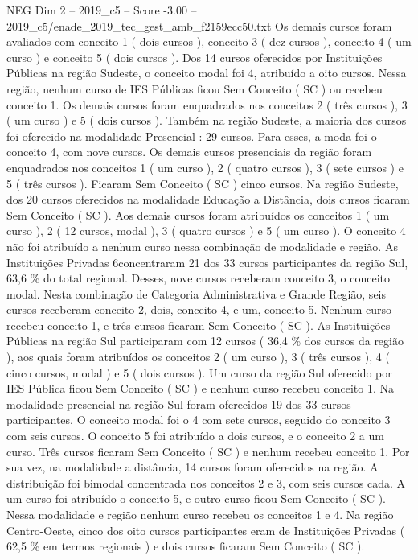 \begin{textsample}{NEG Dim 2 – 2019\_c5 – Score -3.00 – 2019\_c5/enade\_2019\_tec\_gest\_amb\_f2159ecc50.txt}
Os demais cursos foram avaliados com conceito 1 ( dois cursos ), conceito 3 ( dez cursos ), conceito 4 ( um curso ) e conceito 5 ( dois cursos ).
Dos 14 cursos oferecidos por Instituições Públicas na região Sudeste, o conceito modal foi 4, atribuído a oito cursos.
Nessa região, nenhum curso de IES Públicas ficou Sem Conceito ( SC ) ou recebeu conceito 1.
Os demais cursos foram enquadrados nos conceitos 2 ( três cursos ), 3 ( um curso ) e 5 ( dois cursos ).
Também na região Sudeste, a maioria dos cursos foi oferecido na modalidade Presencial : 29 cursos.
Para esses, a moda foi o conceito 4, com nove cursos.
Os demais cursos presenciais da região foram enquadrados nos conceitos 1 ( um curso ), 2 ( quatro cursos ), 3 ( sete cursos ) e 5 ( três cursos ).
Ficaram Sem Conceito ( SC ) cinco cursos.
Na região Sudeste, dos 20 cursos oferecidos na modalidade Educação a Distância, dois cursos ficaram Sem Conceito ( SC ).
Aos demais cursos foram atribuídos os conceitos 1 ( um curso ), 2 ( 12 cursos, modal ), 3 ( quatro cursos ) e 5 ( um curso ).
O conceito 4 não foi atribuído a nenhum curso nessa combinação de modalidade e região.
As Instituições Privadas 6concentraram 21 dos 33 cursos participantes da região Sul, 63,6 \% do total regional.
Desses, nove cursos receberam conceito 3, o conceito modal.
Nesta combinação de Categoria Administrativa e Grande Região, seis cursos receberam conceito 2, dois, conceito 4, e um, conceito 5.
Nenhum curso recebeu conceito 1, e três cursos ficaram Sem Conceito ( SC ).
As Instituições Públicas na região Sul participaram com 12 cursos ( 36,4 \% dos cursos da região ), aos quais foram atribuídos os conceitos 2 ( um curso ), 3 ( três cursos ), 4 ( cinco cursos, modal ) e 5 ( dois cursos ).
Um curso da região Sul oferecido por IES Pública ficou Sem Conceito ( SC ) e nenhum curso recebeu conceito 1.
Na modalidade presencial na região Sul foram oferecidos 19 dos 33 cursos participantes.
O conceito modal foi o 4 com sete cursos, seguido do conceito 3 com seis cursos.
O conceito 5 foi atribuído a dois cursos, e o conceito 2 a um curso.
Três cursos ficaram Sem Conceito ( SC ) e nenhum recebeu conceito 1.
Por sua vez, na modalidade a distância, 14 cursos foram oferecidos na região.
A distribuição foi bimodal concentrada nos conceitos 2 e 3, com seis cursos cada.
A um curso foi atribuído o conceito 5, e outro curso ficou Sem Conceito ( SC ).
Nessa modalidade e região nenhum curso recebeu os conceitos 1 e 4.
Na região Centro-Oeste, cinco dos oito cursos participantes eram de Instituições Privadas ( 62,5 \% em termos regionais ) e dois cursos ficaram Sem Conceito ( SC ).

\end{textsample}
